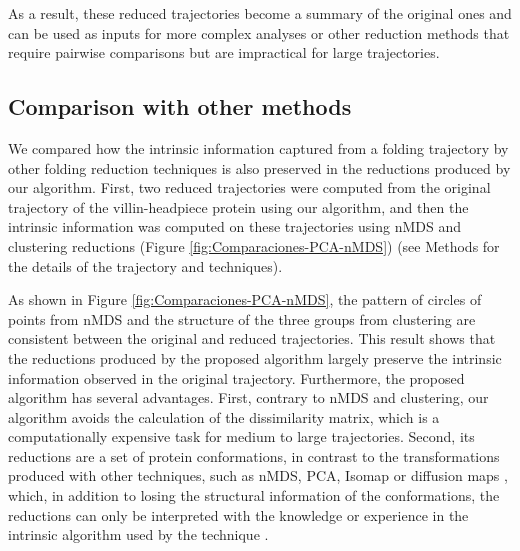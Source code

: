 \documentclass[twocolumn]{bmcart}%
\begin{document}
As a result, these reduced trajectories become a summary of the original ones and can be used as inputs for more complex analyses or other reduction methods that require pairwise comparisons but are impractical for large trajectories.



\subsection*{Comparison with other methods \label{sec:Comparing-other-methods}}

We compared how the intrinsic information captured from a folding trajectory by other folding reduction techniques is also preserved in the reductions produced by our algorithm. First, two reduced trajectories were computed from the original trajectory of the villin-headpiece protein using our algorithm, and then the intrinsic information was computed on these trajectories using nMDS and clustering reductions (Figure \ref{fig:Comparaciones-PCA-nMDS}) (see Methods for the details of the trajectory and techniques).

As shown in Figure \ref{fig:Comparaciones-PCA-nMDS}, the pattern of circles of points from nMDS and the structure of the three groups from clustering are consistent between the original and reduced trajectories. This result shows that the reductions produced by the proposed algorithm largely preserve the intrinsic information observed in the original trajectory. Furthermore, the proposed algorithm has several advantages. First, contrary to nMDS and clustering, our algorithm avoids the calculation of the dissimilarity matrix, which is a computationally expensive task for medium to large trajectories. Second, its reductions are a set of protein conformations, in contrast to the transformations produced with other techniques, such as nMDS, PCA, Isomap or diffusion maps \cite{RajanSchulten10,Duan2014,Kim2015}, which, in addition to losing the structural information of the conformations, the reductions can only be interpreted with the knowledge or experience in the intrinsic algorithm used by the technique \cite{Cavallo2018}.
\end{document}
